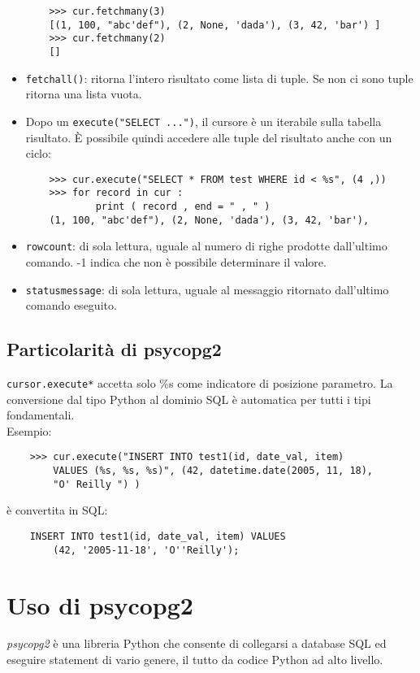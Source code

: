 \documentclass[a4paper, 10pt, titlepage]{article}
\begin{document}
\begin{itemize}
\begin{lstlisting}
	>>> cur.fetchmany(3)
	[(1, 100, "abc'def"), (2, None, 'dada'), (3, 42, 'bar') ]
	>>> cur.fetchmany(2)
	[]
	\end{lstlisting}
	\item \lstinline|fetchall()|: ritorna l'intero risultato come lista di tuple. Se non ci sono tuple ritorna una lista vuota.
	\item Dopo un \lstinline|execute("SELECT ...")|, il cursore è un iterabile sulla tabella risultato. È possibile quindi accedere alle tuple del risultato anche con un ciclo:
	\begin{lstlisting}
	>>> cur.execute("SELECT * FROM test WHERE id < %s", (4 ,))
	>>> for record in cur :
			print ( record , end = " , " )
	(1, 100, "abc'def"), (2, None, 'dada'), (3, 42, 'bar'),
	\end{lstlisting}
	\item \lstinline|rowcount|: di sola lettura, uguale al numero di righe prodotte dall'ultimo comando. -1 indica che non è possibile determinare il valore.
	\item \lstinline|statusmessage|: di sola lettura, uguale al messaggio ritornato dall’ultimo comando eseguito.
	\end{itemize}
	
	\subsection{Particolarità di psycopg2}
	\lstinline[keywordstyle=\color{black}]|cursor.execute*| accetta solo \%s come indicatore di posizione parametro. La conversione dal tipo Python al dominio SQL è automatica per tutti i tipi fondamentali. \\
	Esempio:
	\begin{lstlisting}
	>>> cur.execute("INSERT INTO test1(id, date_val, item) 
		VALUES (%s, %s, %s)", (42, datetime.date(2005, 11, 18),
		"O' Reilly ") )
	\end{lstlisting}
	è convertita in SQL:
	\begin{lstlisting}
	INSERT INTO test1(id, date_val, item) VALUES 
		(42, '2005-11-18', 'O''Reilly');
	\end{lstlisting}
	
	\newpage
	
	\section{Uso di psycopg2}
	\textit{psycopg2} è una libreria Python che consente di collegarsi a database SQL ed eseguire statement di vario genere, il tutto da codice Python ad alto livello.
	
\end{document}
